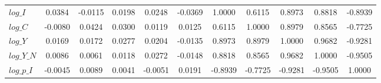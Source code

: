 \begin{center}
\begin{longtable}{lcccccccccc}
$log\_I          $	 & 	            0.0384	 & 	           -0.0115	 & 	            0.0198	 & 	            0.0248	 & 	           -0.0369	 & 	            1.0000	 & 	            0.6115	 & 	            0.8973	 & 	            0.8818	 & 	           -0.8939 \\ 
$log\_C          $	 & 	           -0.0080	 & 	            0.0424	 & 	            0.0300	 & 	            0.0119	 & 	            0.0125	 & 	            0.6115	 & 	            1.0000	 & 	            0.8979	 & 	            0.8565	 & 	           -0.7725 \\ 
$log\_Y          $	 & 	            0.0169	 & 	            0.0172	 & 	            0.0277	 & 	            0.0204	 & 	           -0.0135	 & 	            0.8973	 & 	            0.8979	 & 	            1.0000	 & 	            0.9682	 & 	           -0.9281 \\ 
$log\_Y\_N       $	 & 	            0.0086	 & 	            0.0061	 & 	            0.0118	 & 	            0.0272	 & 	           -0.0148	 & 	            0.8818	 & 	            0.8565	 & 	            0.9682	 & 	            1.0000	 & 	           -0.9505 \\ 
$log\_p\_I       $	 & 	           -0.0045	 & 	            0.0089	 & 	            0.0041	 & 	           -0.0051	 & 	            0.0191	 & 	           -0.8939	 & 	           -0.7725	 & 	           -0.9281	 & 	           -0.9505	 & 	            1.0000 \\ 
\end{longtable}
 \end{center}
